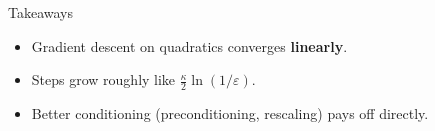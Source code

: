 \documentclass[aspectratio=169,14pt]{beamer}
\newcommand{\HL}[1]{{\color{Accent}\bfseries #1}}
\begin{document}
\begin{frame}{Takeaways}
  \begin{itemize}\setlength{\itemsep}{.8em}
    \item Gradient descent on quadratics converges \HL{linearly}.
    \item Steps grow roughly like $\tfrac{\kappa}{2}\ln(1/\varepsilon)$.
    \item Better conditioning (preconditioning, rescaling) pays off directly.
  \end{itemize}
\end{frame}
\end{document}
